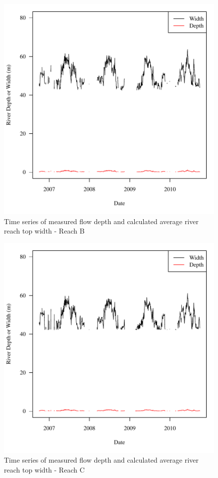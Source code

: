 \begin{center}
\begin{figure}[htbp]
	\includegraphics[width=6in]{"Figures/Results_USR/G d&w Today B"}
	\caption{Time series of measured flow depth and calculated average river reach top width - Reach B}
\end{figure}
\end{center}
\newpage

\begin{center}
\begin{figure}[htbp]
	\includegraphics[width=6in]{"Figures/Results_USR/G d&w Today C"}
	\caption{Time series of measured flow depth and calculated average river reach top width - Reach C}
\end{figure}
\end{center}
\newpage

